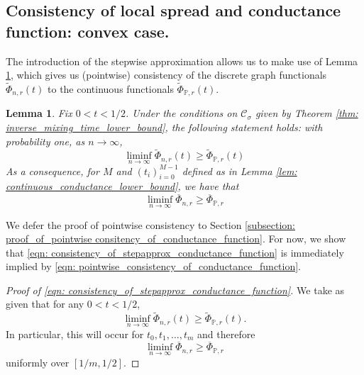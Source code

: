 \documentclass{article}
\newcommand{\1}{\mathbf{1}}
\newcommand{\Pbb}{\mathbb{P}}
\newcommand{\Cset}{\mathcal{C}}
\newcommand{\Csig}{\Cset_{\sigma}}
\theoremstyle{aldenthm}
\newtheorem{lemma}{Lemma}
\begin{document}
\subsection{Consistency of local spread and conductance function: convex case.}
\label{sec: consistency}

The introduction of the stepwise approximation allows us to make use of Lemma \ref{lem: consistency_of_conductance_function}, which gives us (pointwise) consistency of the discrete graph functionals $\widetilde{\Phi}_{n,r}(t)$ to the continuous functionals $\widetilde{\Phi}_{\Pbb,r}(t)$. 

\begin{lemma}
	\label{lem: consistency_of_conductance_function}
	Fix $0 < t < 1/2$. Under the conditions on $\Csig$ given by Theorem \ref{thm: inverse_mixing_time_lower_bound}, the following statement holds: with probability one, as $n \to \infty$,
	\begin{equation}
	\label{eqn: pointwise_consistency_of_conductance_function}
	\liminf_{n \to \infty} \widetilde{\Phi}_{n,r}(t) \geq \widetilde{\Phi}_{\Pbb,r}(t)
	\end{equation}
	As a consequence, for $M$ and $(t_i)_{i=0}^{M-1}$ defined as in Lemma \ref{lem: continuous_conductance_lower_bound}, we have that
	\begin{equation}
	\label{eqn: consistency_of_stepapprox_conductance_function}
	\liminf_{n \to \infty} \overline{\Phi}_{n,r} \geq \overline{\Phi}_{\Pbb,r}
	\end{equation}
\end{lemma}
We defer the proof of pointwise consistency to Section \ref{subsection: proof_of_pointwise consitency_of_conductance_function}. For now, we show that \eqref{eqn: consistency_of_stepapprox_conductance_function} is immediately implied by \eqref{eqn: pointwise_consistency_of_conductance_function}.

\begin{proof}[Proof of \eqref{eqn: consistency_of_stepapprox_conductance_function}]
	We take as given that for any $0 < t < 1/2$,
	\begin{equation*}
	\liminf_{n \to \infty} \widetilde{\Phi}_{n,r}(t) \geq \widetilde{\Phi}_{\Pbb,r}(t).
	\end{equation*}
	In particular, this will occur for $t_0, t_1, \ldots, t_m$ and therefore
	\begin{equation*}
	\liminf_{n \to \infty} \overline{\Phi}_{n,r} \geq \overline{\Phi}_{\Pbb,r}
	\end{equation*}
	uniformly over $[1/m,1/2]$.
\end{proof}
\end{document}
